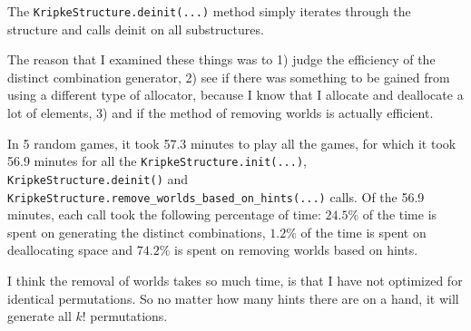 The {\tt KripkeStructure.deinit(...)} method simply iterates through the structure and calls deinit on all substructures.

The reason that I examined these things was to 1) judge the efficiency of the distinct combination generator, 2) see if there was something to be gained from using a different type of allocator, because I know that I allocate and deallocate a lot of elements, 3) and if the method of removing worlds is actually efficient.

In 5 random games, it took 57.3 minutes to play all the games, for which it took 56.9 minutes for all the {\tt KripkeStructure.init(...)}, {\tt KripkeStructure.deinit()} and {\tt KripkeStructure.remove\_worlds\_based\_on\_hints(...)} calls.
Of the 56.9 minutes, each call took the following percentage of time: $24.5\%$ of the time is spent on generating the distinct combinations, $1.2\%$ of the time is spent on deallocating space and $74.2\%$ is spent on removing worlds based on hints.

I think the removal of worlds takes so much time, is that I have not optimized for identical permutations.
So no matter how many hints there are on a hand, it will generate all $k!$ permutations.



